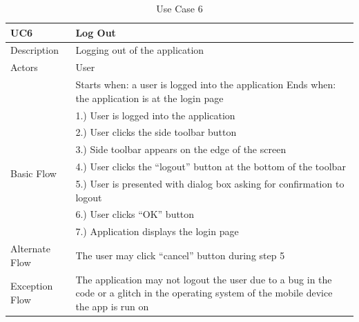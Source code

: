 \documentclass{article}
\begin{document}
\begin{appendicies}
\begin{table}[!htbp]
\centering
\hspace*{-0.5cm}
\begin{tabular}{||m{6cm}|m{6cm}||}
    \hline
    UC6 & Log Out\\
    \hline
    Description & Logging out of the application\\
    \hline
    Actors & User\\
    \hline
    & Starts when: a user is logged into the application \newline
    Ends when: the application is at the login page\\
    \hline
    \multirow{7}{\hsize}{Basic Flow} 
                                    & 1.) User is logged into the application\\
                                    & 2.) User clicks the side toolbar button\\
                                    & 3.) Side toolbar appears on the edge of the screen\\
                                    & 4.) User clicks the “logout” button at the bottom of the toolbar\\
                                    & 5.) User is presented with dialog box asking for confirmation to logout\\
                                    & 6.) User clicks “OK” button\\
                                    & 7.) Application displays the login page\\
    \hline
    Alternate Flow & The user may click “cancel” button during step 5\\
    \hline 
    Exception Flow & The application may not logout the user due to a bug in the code or a glitch in the operating system of the mobile device the app is run on\\
\hline
\end{tabular}
\caption{Use Case 6}
\label{table:UC6}
\end{table}


\end{appendicies}
\end{document}
